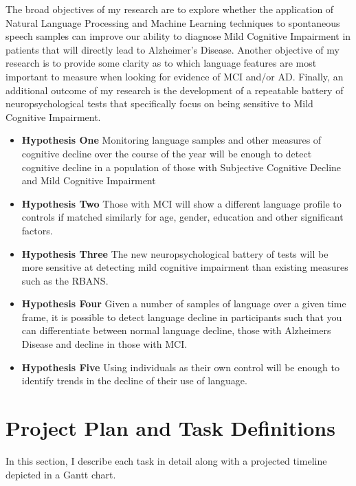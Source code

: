 \documentclass[10pt, letterpaper, twoside, openany]{book}
\begin{document}
\par 
The broad objectives of my research are to explore whether the application of Natural Language Processing and Machine Learning techniques to spontaneous speech samples can improve our ability to diagnose Mild Cognitive Impairment in patients that will directly lead to Alzheimer's Disease. Another objective of my research is to provide some clarity as to which language features are most important to measure when looking for evidence of MCI and/or AD. Finally, an additional outcome of my research is the development of a repeatable battery of neuropsychological tests that specifically focus on being sensitive to Mild Cognitive Impairment.
\begin{itemize}
	\item \textbf{Hypothesis One} Monitoring language samples and other measures of cognitive decline over the course of the year will be enough to detect cognitive decline in a population of those with Subjective Cognitive Decline and Mild Cognitive Impairment
	\item \textbf{Hypothesis Two} Those with MCI will show a different language profile to controls if matched similarly for age, gender, education and other significant factors.
	\item \textbf{Hypothesis Three} The new neuropsychological battery of tests will be more sensitive at detecting mild cognitive impairment than existing measures such as the RBANS.
	\item \textbf{Hypothesis Four} Given a number of samples of language over a given time frame, it is possible to detect language decline in participants such that you can differentiate between normal language decline, those with Alzheimers Disease and decline in those with MCI.
	\item \textbf{Hypothesis Five} Using individuals as their own control will be enough to identify trends in the decline of their use of language.
\end{itemize}

\section{Project Plan and Task Definitions}
In this section, I describe each task in detail along with a projected timeline depicted in a Gantt chart.
\end{document}
